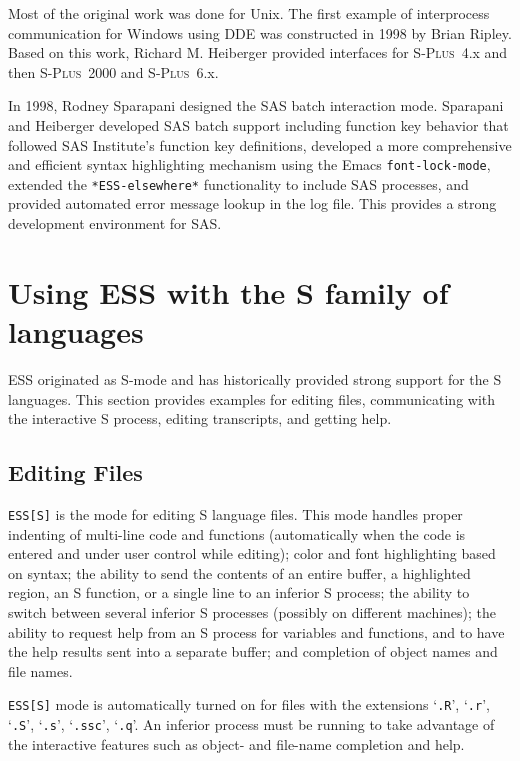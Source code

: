 \documentclass{article}
\newcommand*{\Splus}{\textsc{S-Plus}}
\newcommand{\stexttt}[1]{{\small\texttt{#1}}}
\newcommand{\file}[1]{`\stexttt{#1}'}
\begin{document}
Most of the original work was done for Unix.  The first example of
interprocess communication for Windows using DDE was constructed in
1998 by Brian Ripley.  Based on this work, Richard M. Heiberger
provided interfaces for \Splus~4.x and then \Splus~2000 and
\Splus~6.x.

In 1998, Rodney Sparapani designed the SAS batch interaction
mode.  Sparapani and Heiberger developed SAS batch support including
function key behavior that followed SAS Institute's function key
definitions, developed a more comprehensive and efficient syntax
highlighting mechanism using the Emacs \stexttt{font-lock-mode},
extended the \stexttt{*ESS-elsewhere*} functionality to include SAS
processes, and provided automated error message lookup in the log
file.  This provides a strong development environment for SAS.

\section{Using ESS with the S family of languages}
\label{sec:S}

ESS originated as S-mode and has historically provided strong support
for the S languages.  This section provides examples for editing
files, communicating with the interactive S process, editing
transcripts, and getting help.

\subsection{Editing Files}
\label{sec:S:edit}

\stexttt{ESS[S]} is the mode for editing S language files.  This mode
handles proper indenting of multi-line code and functions
(automatically when the code is entered and under user control while
editing); color and font highlighting based on syntax; the ability to
send the contents of an entire buffer, a highlighted region, an S
function, or a single line to an inferior S process; the ability to
switch between several inferior S processes (possibly on different
machines); the ability to request help from an S process for variables
and functions, and to have the help results sent into a separate
buffer; and completion of object names and file names.

\stexttt{ESS[S]} mode is automatically turned on for files with the
extensions \file{.R}, \file{.r}, \file{.S}, \file{.s}, \file{.ssc},
\file{.q}.  An inferior process must be running to take advantage of
the interactive features such as object- and file-name completion and
help.
\end{document}
